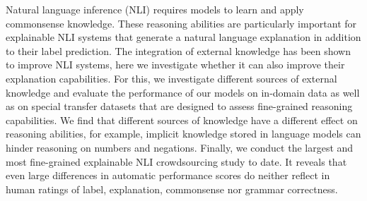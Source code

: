 Natural language inference (NLI) requires models to learn and apply commonsense knowledge. These reasoning abilities are particularly important for explainable NLI systems that generate a natural language explanation in addition to their label prediction. The integration of external knowledge has been shown to improve NLI systems, here we investigate whether it can also improve their explanation capabilities. For this, we investigate different sources of external knowledge and evaluate the performance of our models on in-domain data as well as on special transfer datasets that are designed to assess fine-grained reasoning capabilities. We find that different sources of knowledge have a different effect on reasoning abilities, for example, implicit knowledge stored in language models can hinder reasoning on numbers and negations. Finally, we conduct the largest and most fine-grained explainable NLI crowdsourcing study to date. It reveals that even large differences in automatic performance scores do neither reflect in human ratings of label, explanation, commonsense nor grammar correctness.
